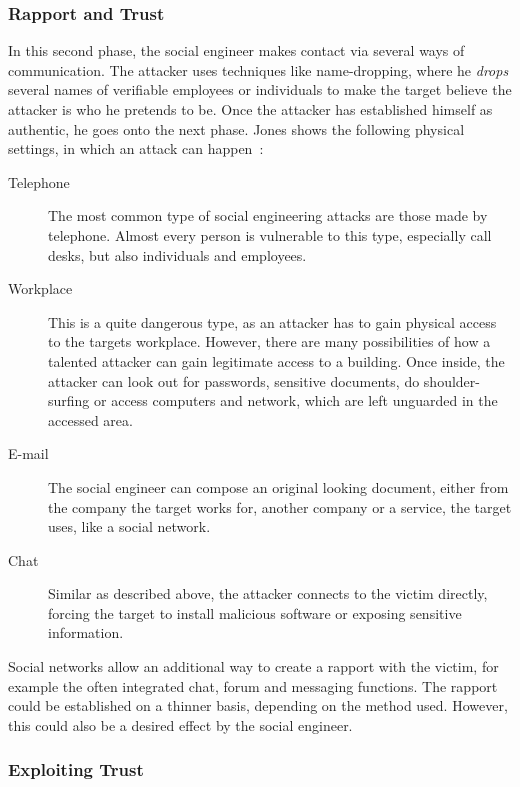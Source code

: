 \subsubsection{Rapport and Trust}

In this second phase, the social engineer makes contact via several ways of
communication. The attacker uses techniques like name-dropping, where he
\textit{drops} several names of verifiable employees or individuals to make the
target believe the attacker is who he pretends to be. Once the attacker has
established himself as authentic, he goes onto the next phase. Jones
shows the following physical settings, in which an attack can happen~\cite{jones2004}:

\begin{description}
\item[Telephone] The most common type of social engineering attacks are those
  made by telephone. Almost every person is vulnerable to this type,
  especially call desks, but also individuals and employees.
\item[Workplace] This is a quite dangerous type, as an attacker has to gain
  physical access to the targets workplace. However, there are many
  possibilities of how a talented attacker can gain legitimate access to a building.
  Once inside, the attacker can look out for passwords, sensitive documents,
  do shoulder-surfing or access computers and network, which are left
  unguarded in the accessed area.
\item[E-mail] The social engineer can compose an original looking document,
  either from the company the target works for, another company or a service,
  the target uses, like a social network.
\item[Chat] Similar as described above, the attacker connects to the victim directly,
  forcing the target to install malicious software or exposing sensitive
  information.
\end{description}

Social networks allow an additional way to create a rapport with the victim,
for example the often integrated chat, forum and messaging functions. The
rapport could be established on a thinner basis, depending on the method used.
However, this could also be a desired effect by the social engineer.


\subsubsection{Exploiting Trust}

